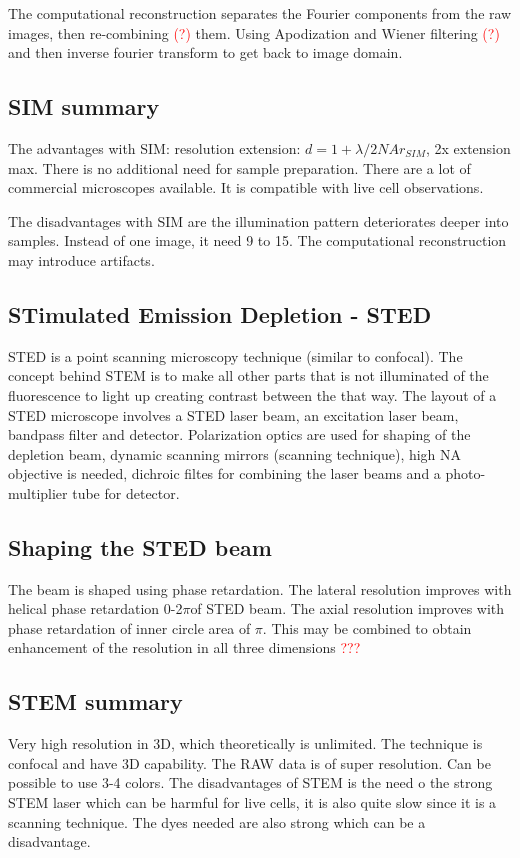 	The computational reconstruction separates the Fourier components from the raw images, then re-combining \textcolor{red}{(?)}  them. Using Apodization and Wiener filtering \textcolor{red}{(?)}  and then inverse fourier transform to get back to image domain.   

	\subsection*{SIM summary}
	
	The advantages with SIM: resolution extension: $d = 1 + \lambda /2NA r_{SIM}$, 2x extension max. There is no additional need for sample preparation. There are a lot of commercial microscopes available. It is compatible with live cell observations. 

	The disadvantages with SIM are the illumination pattern deteriorates deeper into samples. Instead of one image, it need 9 to 15. The computational reconstruction may introduce artifacts. 


	\subsection*{STimulated Emission Depletion - STED}
	STED is a point scanning microscopy technique (similar to confocal). The concept behind STEM is to make all other parts that is not illuminated of the fluorescence to light up creating contrast between the that way. The layout of a STED microscope involves a STED laser beam, an excitation laser beam, bandpass filter and detector. Polarization optics are used for shaping of the depletion beam, dynamic scanning mirrors (scanning technique), high NA objective is needed, dichroic filtes for combining the laser beams and a photo-multiplier tube for detector. 

	\subsection*{Shaping the STED beam}
	The beam is shaped using phase retardation. The lateral resolution improves with helical phase retardation 0-2$\pi$of STED beam. The axial resolution improves with phase retardation of inner circle area of $\pi$. This may be combined to obtain enhancement of the resolution in all three dimensions \textcolor{red}{???} 

	\subsection*{STEM summary}
	Very high resolution in 3D, which theoretically is unlimited. The technique is confocal and have 3D capability. The RAW data is of super resolution. Can be possible to use 3-4 colors. The disadvantages of STEM is the need o the strong STEM laser which can be harmful for live cells, it is also quite slow since it is a scanning technique. The dyes needed are also strong which can be a disadvantage. 

